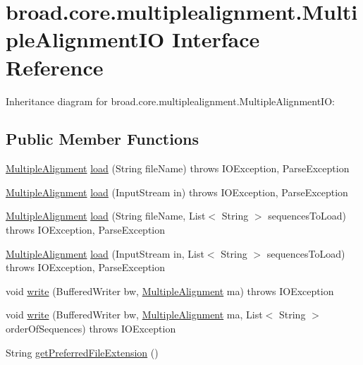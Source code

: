 \hypertarget{interfacebroad_1_1core_1_1multiplealignment_1_1_multiple_alignment_i_o}{\section{broad.\+core.\+multiplealignment.\+Multiple\+Alignment\+I\+O Interface Reference}
\label{interfacebroad_1_1core_1_1multiplealignment_1_1_multiple_alignment_i_o}
}


Inheritance diagram for broad.\+core.\+multiplealignment.\+Multiple\+Alignment\+I\+O\+:
\subsection*{Public Member Functions}
\begin{DoxyCompactItemize}
\item 
\hyperlink{classbroad_1_1core_1_1multiplealignment_1_1_multiple_alignment}{Multiple\+Alignment} \hyperlink{interfacebroad_1_1core_1_1multiplealignment_1_1_multiple_alignment_i_o_aa1f16d1580d451f8702f430094c979aa}{load} (String file\+Name)  throws I\+O\+Exception, Parse\+Exception
\item 
\hyperlink{classbroad_1_1core_1_1multiplealignment_1_1_multiple_alignment}{Multiple\+Alignment} \hyperlink{interfacebroad_1_1core_1_1multiplealignment_1_1_multiple_alignment_i_o_a75876191a308ebeda8a55f468d8d715e}{load} (Input\+Stream in)  throws I\+O\+Exception, Parse\+Exception
\item 
\hyperlink{classbroad_1_1core_1_1multiplealignment_1_1_multiple_alignment}{Multiple\+Alignment} \hyperlink{interfacebroad_1_1core_1_1multiplealignment_1_1_multiple_alignment_i_o_add05c676a62b3db6dbf1463ab94547ce}{load} (String file\+Name, List$<$ String $>$ sequences\+To\+Load)  throws I\+O\+Exception, Parse\+Exception
\item 
\hyperlink{classbroad_1_1core_1_1multiplealignment_1_1_multiple_alignment}{Multiple\+Alignment} \hyperlink{interfacebroad_1_1core_1_1multiplealignment_1_1_multiple_alignment_i_o_a8f1ccd3a7e72ba1fdbc6156afd167289}{load} (Input\+Stream in, List$<$ String $>$ sequences\+To\+Load)  throws I\+O\+Exception, Parse\+Exception
\item 
void \hyperlink{interfacebroad_1_1core_1_1multiplealignment_1_1_multiple_alignment_i_o_af1613ef893b3cb457a4e96bc24f01584}{write} (Buffered\+Writer bw, \hyperlink{classbroad_1_1core_1_1multiplealignment_1_1_multiple_alignment}{Multiple\+Alignment} ma)  throws I\+O\+Exception
\item 
void \hyperlink{interfacebroad_1_1core_1_1multiplealignment_1_1_multiple_alignment_i_o_ae9f18851300fa99805c3f867b12727c7}{write} (Buffered\+Writer bw, \hyperlink{classbroad_1_1core_1_1multiplealignment_1_1_multiple_alignment}{Multiple\+Alignment} ma, List$<$ String $>$ order\+Of\+Sequences)  throws I\+O\+Exception 
\item 
String \hyperlink{interfacebroad_1_1core_1_1multiplealignment_1_1_multiple_alignment_i_o_a188e4b85766ab0438ccb1f22a0eaa23a}{get\+Preferred\+File\+Extension} ()
\end{DoxyCompactItemize}


